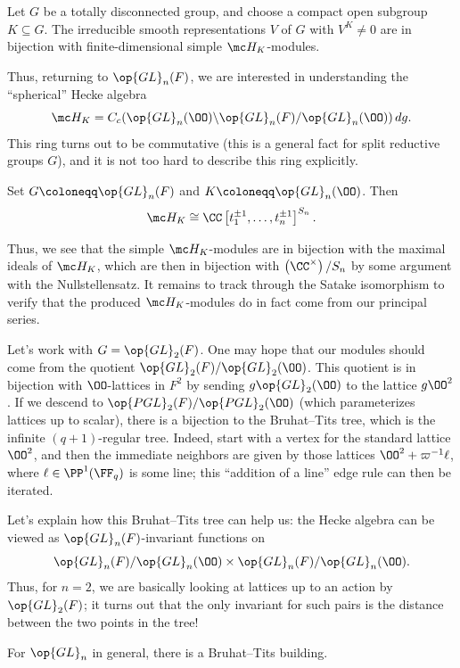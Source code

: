 \documentclass[../notes.tex]{subfiles}
\begin{document}
\begin{corollary}
	Let $G$ be a totally disconnected group, and choose a compact open subgroup $K\subseteq G$. The irreducible smooth representations $V$ of $G$ with $V^K\ne0$ are in bijection with finite-dimensional simple $\mc H_K$-modules.
\end{corollary}
Thus, returning to $\op{GL}_n(F)$, we are interested in understanding the ``spherical'' Hecke algebra
\[\mc H_K=C_c(\op{GL}_n(\OO)\backslash\op{GL}_n(F)/\op{GL}_n(\OO))\,dg.\]
This ring turns out to be commutative (this is a general fact for split reductive groups $G$), and it is not too hard to describe this ring explicitly.
\begin{theorem}[Satake]
	Set $G\coloneqq\op{GL}_n(F)$ and $K\coloneqq\op{GL}_n(\OO)$. Then
	\[\mc H_K\cong\CC\left[t_1^{\pm1},\ldots,t_n^{\pm1}\right]^{S_n}.\]
\end{theorem}
Thus, we see that the simple $\mc H_K$-modules are in bijection with the maximal ideals of $\mc H_K$, which are then in bijection with $\left(\CC^\times\right)/S_n$ by some argument with the Nullstellensatz. It remains to track through the Satake isomorphism to verify that the produced $\mc H_K$-modules do in fact come from our principal series.
\begin{example}
	Let's work with $G=\op{GL}_2(F)$. One may hope that our modules should come from the quotient $\op{GL}_2(F)/\op{GL}_2(\OO)$. This quotient is in bijection with $\OO$-lattices in $F^2$ by sending $g\op{GL}_2(\OO)$ to the lattice $g\OO^2$. If we descend to $\op{PGL}_2(F)/\op{PGL}_2(\OO)$ (which parameterizes lattices up to scalar), there is a bijection to the Bruhat--Tits tree, which is the infinite $(q+1)$-regular tree. Indeed, start with a vertex for the standard lattice $\OO^2$, and then the immediate neighbors are given by those lattices $\OO^2+\varpi^{-1}\ell$, where $\ell\in\PP^1(\FF_q)$ is some line; this ``addition of a line'' edge rule can then be iterated.
\end{example}
\begin{remark}
	Let's explain how this Bruhat--Tits tree can help us: the Hecke algebra can be viewed as $\op{GL}_n(F)$-invariant functions on
	\[\op{GL}_n(F)/\op{GL}_n(\OO)\times\op{GL}_n(F)/\op{GL}_n(\OO).\]
	Thus, for $n=2$, we are basically looking at lattices up to an action by $\op{GL}_2(F)$; it turns out that the only invariant for such pairs is the distance between the two points in the tree!
\end{remark}
\begin{remark}
	For $\op{GL}_n$ in general, there is a Bruhat--Tits building.
\end{remark}
\end{document}
